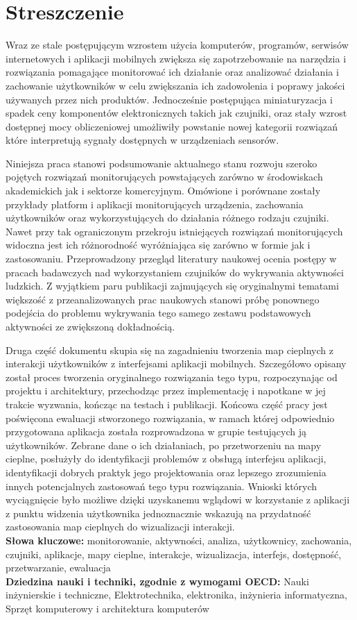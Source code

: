 \chapter*{Streszczenie}
Wraz ze stale postępującym wzrostem użycia komputerów, programów, serwisów internetowych i aplikacji mobilnych zwiększa się zapotrzebowanie na narzędzia i rozwiązania pomagające monitorować ich działanie oraz analizować działania i zachowanie użytkowników w celu zwiększania ich zadowolenia i poprawy jakości używanych przez nich produktów. Jednocześnie postępująca miniaturyzacja i spadek ceny komponentów elektronicznych takich jak czujniki, oraz stały wzrost dostępnej mocy obliczeniowej umożliwiły powstanie nowej kategorii rozwiązań które interpretują sygnały dostępnych w urządzeniach sensorów. 

Niniejsza praca stanowi podsumowanie aktualnego stanu rozwoju szeroko pojętych rozwiązań monitorujących powstających zarówno w środowiskach akademickich jak i sektorze komercyjnym. Omówione i porównane zostały przykłady platform i aplikacji monitorujących urządzenia, zachowania użytkowników oraz wykorzystujących do działania różnego rodzaju czujniki. Nawet przy tak ograniczonym przekroju istniejących rozwiązań monitorujących widoczna jest ich różnorodność wyróżniająca się zarówno w formie jak i zastosowaniu. Przeprowadzony przegląd literatury naukowej ocenia postępy w pracach badawczych nad wykorzystaniem czujników do wykrywania aktywności ludzkich. Z wyjątkiem paru publikacji zajmujących się oryginalnymi tematami większość z przeanalizowanych prac naukowych stanowi próbę ponownego podejścia do problemu wykrywania tego samego zestawu podstawowych aktywności ze zwiększoną dokładnością. 

Druga część dokumentu skupia się na zagadnieniu tworzenia map cieplnych z interakcji użytkowników z interfejsami aplikacji mobilnych. Szczegółowo opisany został proces tworzenia oryginalnego rozwiązania tego typu, rozpoczynając od projektu i architektury, przechodząc przez implementację i napotkane w jej trakcie wyzwania, kończąc na testach i publikacji. Końcowa część pracy jest poświęcona ewaluacji stworzonego rozwiązania, w ramach której odpowiednio przygotowana aplikacja została rozprowadzona w grupie testujących ją użytkowników. Zebrane dane o ich działaniach, po przetworzeniu na mapy cieplne, posłużyły do identyfikacji problemów z obsługą interfejsu aplikacji, identyfikacji dobrych praktyk jego projektowania oraz lepszego zrozumienia innych potencjalnych zastosowań tego typu rozwiązania. Wnioski których wyciągnięcie było możliwe dzięki uzyskanemu wglądowi w korzystanie z aplikacji z punktu widzenia użytkownika jednoznacznie wskazują na przydatność zastosowania map cieplnych do wizualizacji interakcji. \\

\noindent\textbf{Słowa kluczowe:} monitorowanie, aktywności, analiza, użytkownicy, zachowania, czujniki, aplikacje, mapy cieplne, interakcje, wizualizacja, interfejs, dostępność, przetwarzanie, ewaluacja \\

\noindent\textbf{Dziedzina nauki i techniki, zgodnie z wymogami OECD:} Nauki inżynierskie i techniczne, Elektrotechnika, elektronika, inżynieria informatyczna, Sprzęt komputerowy i architektura komputerów

